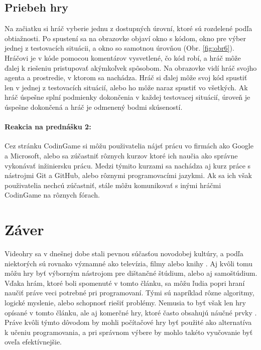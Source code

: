 \documentclass[slovak,a4paper,10pt]{article}
\begin{document}
\subsection{Priebeh hry}
Na začiatku si hráč vyberie jednu z dostupných úrovní, ktoré sú rozdelené podľa obtiažnosti. Po spustení sa na obrazovke objaví okno s kódom, okno pre výber jednej z testovacích situácii, a okno so samotnou úrovňou (Obr. \ref{fig:obr6}). Hráčovi je v kóde pomocou komentárov vysvetlené, čo kód robí, a hráč môže ďalej k riešeniu pristupovať akýmkoľvek spôsobom. Na obrazovke vidí hráč svojho agenta a prostredie, v ktorom sa nachádza. Hráč si ďalej môže svoj kód spustiť len v jednej z testovacích situácií, alebo ho môže naraz spustiť vo všetkých. Ak hráč úspešne splní podmienky dokončenia v každej testovacej situácií, úroveň je úspešne dokončená a hráč je odmenený bodmi skúseností.\\
\paragraph{Reakcia na prednášku 2:}
Cez stránku CodinGame si môžu použivatelia nájsť prácu vo firmách ako Google a Microsoft, alebo sa zúčastniť rôznych kurzov ktoré ich naučia ako správne vykonávať inžiniersku prácu. Medzi týmito kurzami sa nachádza aj kurz práce s nástrojmi Git a GitHub, alebo rôznymi programovacími jazykmi. Ak sa ich však použivatelia nechcú zúčastniť, stále môžu komunikovať s inými hráčmi CodinGame na rôznych fórach.


\section{Záver}
Videohry sa v dnešnej dobe stali pevnou súčasťou novodobej kultúry, a podľa niektorých sú rovnako významné ako televízia, filmy alebo knihy \cite{muratet2009towards}. Aj kvôli tomu môžu hry byť výborným nástrojom pre dištančné štúdium, alebo aj samoštúdium. Vďaka hrám, ktoré boli spomenuté v tomto článku, sa môžu ľudia popri hraní naučiť práve veci potrebné pri programovaní. Tými sú napríklad rôzne algoritmy, logické myslenie, alebo schopnosť riešiť problémy. Nemusia to byť však len hry opísané v tomto článku, ale aj komerčné hry, ktoré často obsahujú náučné prvky \cite{barr2018student}. Práve kvôli týmto dôvodom by mohli počítačové hry byť použité ako alternatíva k učeniu programovania, a pri správnom výbere by mohlo takéto vyučovanie byť oveľa efektívnejšie.



\end{document}
